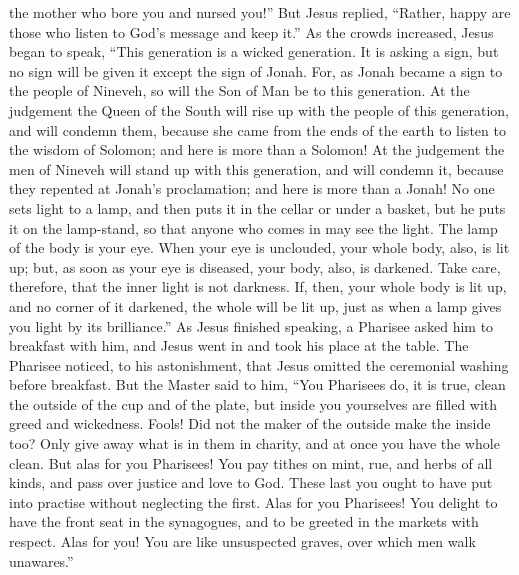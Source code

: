 the mother who bore you and nursed you!''  But Jesus
replied, ``Rather, happy are those who listen to God's message and keep
it.''  As the crowds increased, Jesus began to speak,
``This generation is a wicked generation. It is asking a sign, but no
sign will be given it except the sign of Jonah.  For, as
Jonah became a sign to the people of Nineveh, so will the Son of Man be
to this generation.  At the judgement the Queen of the
South will rise up with the people of this generation, and will condemn
them, because she came from the ends of the earth to listen to the
wisdom of Solomon; and here is more than a Solomon!  At the
judgement the men of Nineveh will stand up with this generation, and
will condemn it, because they repented at Jonah's proclamation; and here
is more than a Jonah!  No one sets light to a lamp, and
then puts it in the cellar or under a basket, but he puts it on the
lamp-stand, so that anyone who comes in may see the light. 
The lamp of the body is your eye. When your eye is unclouded, your whole
body, also, is lit up; but, as soon as your eye is diseased, your body,
also, is darkened.  Take care, therefore, that the inner
light is not darkness.  If, then, your whole body is lit
up, and no corner of it darkened, the whole will be lit up, just as when
a lamp gives you light by its brilliance.''  As Jesus
finished speaking, a Pharisee asked him to breakfast with him, and Jesus
went in and took his place at the table.  The Pharisee
noticed, to his astonishment, that Jesus omitted the ceremonial washing
before breakfast.  But the Master said to him, ``You
Pharisees do, it is true, clean the outside of the cup and of the plate,
but inside you yourselves are filled with greed and wickedness.
 Fools! Did not the maker of the outside make the inside
too?  Only give away what is in them in charity, and at
once you have the whole clean.  But alas for you Pharisees!
You pay tithes on mint, rue, and herbs of all kinds, and pass over
justice and love to God. These last you ought to have put into practise
without neglecting the first.  Alas for you Pharisees! You
delight to have the front seat in the synagogues, and to be greeted in
the markets with respect.  Alas for you! You are like
unsuspected graves, over which men walk unawares.''

